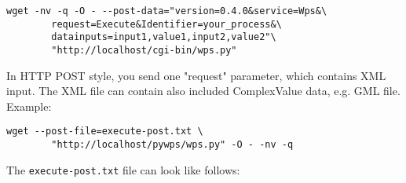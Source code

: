 \documentclass[a4paper,11pt]{article}
\begin{document}
\begin{verbatim}
wget -nv -q -O - --post-data="version=0.4.0&service=Wps&\
        request=Execute&Identifier=your_process&\
        datainputs=input1,value1,input2,value2"\
        "http://localhost/cgi-bin/wps.py"
\end{verbatim}
    
In HTTP POST style, you send one "request" parameter, which contains XML input. The XML file can contain also included ComplexValue data, e.g. GML file. Example:
    
\begin{verbatim}
wget --post-file=execute-post.txt \
        "http://localhost/pywps/wps.py" -O - -nv -q
\end{verbatim}
    
The \texttt{execute-post.txt} file can look like follows:
\end{document}
